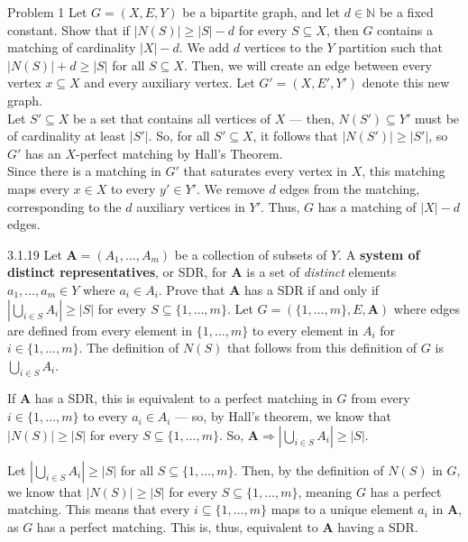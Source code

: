 \documentclass[10pt]{extarticle}
\title{}
\author{Avinash Iyer}
\date{}
\begin{document}
{
  \begin{problem}{Problem 1}
    Let $G = (X,E,Y)$ be a bipartite graph, and let $d\in \mathbb{N}$ be a fixed constant. Show that if $|N(S)| \geq |S|-d$ for every $S\subseteq X$, then $G$ contains a matching of cardinality $|X|-d$.
    \tcblower
    We add $d$ vertices to the $Y$ partition such that $|N(S)| + d \geq |S|$ for all $S\subseteq X$. Then, we will create an edge between every vertex $x\subseteq X$ and every auxiliary vertex. Let $G' = (X,E',Y')$ denote this new graph.\\

    Let $S'\subseteq X$ be a set that contains all vertices of $X$ --- then, $N(S') \subseteq Y'$ must be of cardinality at least $|S'|$. So, for all $S'\subseteq X$, it follows that $|N(S')| \geq |S'|$, so $G'$ has an $X$-perfect matching by Hall's Theorem.\\

    Since there is a matching in $G'$ that saturates every vertex in $X$, this matching maps every $x\in X$ to every $y'\in Y'$. We remove $d$ edges from the matching, corresponding to the $d$ auxiliary vertices in $Y'$. Thus, $G$ has a matching of $|X|-d$ edges.
  \end{problem}
  \begin{problem}{3.1.19}
    Let $\mathbf{A} = (A_1,\dots,A_m)$ be a collection of subsets of $Y$. A \textbf{system of distinct representatives}, or SDR, for $\mathbf{A}$ is a set of \textit{distinct} elements $a_1,\dots,a_m\in Y$ where $a_i\in A_i$. Prove that $\mathbf{A}$ has a SDR if and only if $\left|\bigcup_{i\in S} A_i\right| \geq |S|$ for every $S\subseteq \{1,\dots,m\}$.
    \tcblower
    Let $G = (\{1,\dots,m\},E,\mathbf{A})$ where edges are defined from every element in $\{1,\dots,m\}$ to every element in $A_i$ for $i\in \{1,\dots,m\}$. The definition of $N(S)$ that follows from this definition of $G$ is $\bigcup_{i\in S} A_i$.
    \begin{description}[font=\normalfont\scshape]
      \item[$(\Rightarrow)$] If $\mathbf{A}$ has a SDR, this is equivalent to a perfect matching in $G$ from every $i\in \{1,\dots,m\}$ to every $a_i\in A_i$ --- so, by Hall's theorem, we know that $|N(S)| \geq |S|$ for every $S\subseteq \{1,\dots,m\}$. So, $\mathbf{A} \Rightarrow \left|\bigcup_{i\in S} A_i\right| \geq |S|$.\\
      \item[$(\Leftarrow)$] Let $\left|\bigcup_{i\in S}A_i\right| \geq |S|$ for all $S\subseteq \{1,\dots,m\}$. Then, by the definition of $N(S)$ in $G$, we know that $|N(S)| \geq |S|$ for every $S\subseteq \{1,\dots,m\}$, meaning $G$ has a perfect matching. This means that every $i\subseteq \{1,\dots,m\}$ maps to a unique element $a_i$ in $\mathbf{A}$, as $G$ has a perfect matching. This is, thus, equivalent to $\mathbf{A}$ having a SDR.
    \end{description}


\end{problem}}
\end{document}
